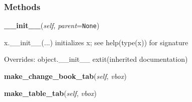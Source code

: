 
  \subsubsection{Methods}

    \vspace{0.5ex}

\hspace{.8\funcindent}\begin{boxedminipage}{\funcwidth}

    \raggedright \textbf{\_\_init\_\_}(\textit{self}, \textit{parent}={\tt None})

\setlength{\parskip}{2ex}
    x.\_\_init\_\_(...) initializes x; see help(type(x)) for signature

\setlength{\parskip}{1ex}
      Overrides: object.\_\_init\_\_ 	extit{(inherited documentation)}

    \end{boxedminipage}

    \label{TabClass:TabWidget:make_change_book_tab}

    \vspace{0.5ex}

\hspace{.8\funcindent}\begin{boxedminipage}{\funcwidth}

    \raggedright \textbf{make\_change\_book\_tab}(\textit{self}, \textit{vbox})

\setlength{\parskip}{2ex}
\setlength{\parskip}{1ex}
    \end{boxedminipage}

    \label{TabClass:TabWidget:make_table_tab}

    \vspace{0.5ex}

\hspace{.8\funcindent}\begin{boxedminipage}{\funcwidth}

    \raggedright \textbf{make\_table\_tab}(\textit{self}, \textit{vbox})

\setlength{\parskip}{2ex}
\setlength{\parskip}{1ex}
    \end{boxedminipage}

